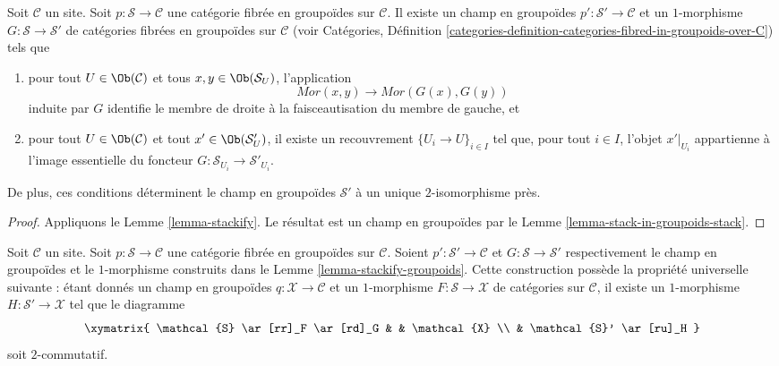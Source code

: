 \begin{lemma}
\label{lemma-stackify-groupoids}
Soit $\mathcal{C}$ un site.
Soit $p : \mathcal{S} \to \mathcal{C}$ une catégorie
fibrée en groupoïdes sur $\mathcal{C}$.
Il existe un champ en groupoïdes
$p' : \mathcal{S}' \to \mathcal{C}$ et un
$1$-morphisme $G : \mathcal{S} \to \mathcal{S}'$
de catégories fibrées en groupoïdes sur $\mathcal{C}$ (voir
Catégories, Définition
\ref{categories-definition-categories-fibred-in-groupoids-over-C})
tels que
\begin{enumerate}
\item pour tout $U \in \Ob(\mathcal{C})$ et tous
$x, y \in \Ob(\mathcal{S}_U)$, l'application
$$
\mathit{Mor}(x, y) \longrightarrow \mathit{Mor}(G(x), G(y))
$$
induite par $G$ identifie le membre de droite à la faisceautisation
du membre de gauche, et
\item pour tout $U \in \Ob(\mathcal{C})$ et tout
$x' \in \Ob(\mathcal{S}'_U)$, il existe un recouvrement
$\{U_i \to U\}_{i \in I}$ tel que, pour tout $i \in I$,
l'objet $x'|_{U_i}$ appartienne à l'image essentielle du
foncteur $G : \mathcal{S}_{U_i} \to \mathcal{S}'_{U_i}$.
\end{enumerate}
De plus, ces conditions déterminent le champ en groupoïdes $\mathcal{S}'$
à un unique $2$-isomorphisme près.
\end{lemma}

\begin{proof}
Appliquons le Lemme \ref{lemma-stackify}. Le résultat est un
champ en groupoïdes par le Lemme \ref{lemma-stack-in-groupoids-stack}.
\end{proof}

\begin{lemma}
\label{lemma-stackify-groupoids-universal-property}
Soit $\mathcal{C}$ un site.
Soit $p : \mathcal{S} \to \mathcal{C}$ une catégorie fibrée en groupoïdes
sur $\mathcal{C}$. Soient $p' : \mathcal{S}' \to \mathcal{C}$ et
$G : \mathcal{S} \to \mathcal{S}'$
respectivement le champ en groupoïdes et le $1$-morphisme construits dans le
Lemme \ref{lemma-stackify-groupoids}.
Cette construction possède la propriété universelle suivante : étant donnés un champ
en groupoïdes $q : \mathcal{X} \to \mathcal{C}$ et un $1$-morphisme
$F : \mathcal{S} \to \mathcal{X}$ de catégories sur $\mathcal{C}$,
il existe un $1$-morphisme $H : \mathcal{S}' \to \mathcal{X}$
tel que le diagramme
$$
\xymatrix{
\mathcal{S} \ar[rr]_F \ar[rd]_G & & \mathcal{X} \\
& \mathcal{S}' \ar[ru]_H
}
$$
soit $2$-commutatif.
\end{lemma}

